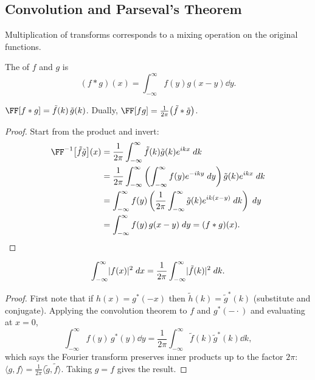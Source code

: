 \documentclass[a4paper]{scrartcl}
\begin{document}
\subsection{Convolution and Parseval's Theorem}

Multiplication of transforms corresponds to a mixing operation on the original functions.

\begin{definition}[Convolution]
    The  of $f$ and $g$ is
    $$
    (f * g)(x) = \int_{-\infty}^{\infty} f(y) g(x - y) \dd y.
    $$
\end{definition}

\begin{theorem}
    $\FF[f * g] = \tilde{f}(k)\, \tilde{g}(k)$. Dually, $\FF[fg] = \frac{1}{2\pi} \big(\tilde{f} * \tilde{g}\big)$.
\end{theorem}
\begin{proof}
    Start from the product and invert:
    \begin{align*}
        \FF^{-1}\big[\tilde f \tilde g\big](x) &= \frac{1}{2\pi}\int_{-\infty}^{\infty} \tilde{f}(k) \tilde{g}(k) e^{ikx} \dd k \\
        &= \frac{1}{2\pi}\int_{-\infty}^{\infty} \left(\int_{-\infty}^{\infty} f(y) e^{-iky} \dd y\right) \tilde{g}(k) e^{ikx} \dd k \\
        &= \int_{-\infty}^{\infty} f(y) \left(\frac{1}{2 \pi}\int_{-\infty}^{\infty} \tilde{g}(k) e^{ik(x - y)} \dd k\right) \dd y \\
        &= \int_{-\infty}^{\infty} f(y)\, g(x - y) \dd y = (f * g)(x). \qedhere
    \end{align*}
\end{proof}

\begin{theorem}
    $$
    \int_{-\infty}^{\infty} \lvert f(x)\rvert^2 \; d x = \frac{1}{2\pi} \int_{-\infty}^{\infty} \lvert\tilde{f}(k)\rvert^2 \; d k.
    $$
\end{theorem}
\begin{proof}
    First note that if $h(x) = g^*(-x)$ then $\tilde{h}(k) = \tilde{g}^*(k)$ (substitute and conjugate). Applying the convolution theorem to $f$ and $g^*(-\cdot)$ and evaluating at $x = 0$,
    $$
    \int_{-\infty}^{\infty} f(y)\, g^*(y) \dd y = \frac{1}{2\pi}\int_{-\infty}^{\infty} \tilde{f}(k) \tilde{g}^*(k) \dd k,
    $$
    which says the Fourier transform preserves inner products up to the factor $2\pi$: $\langle g, f\rangle = \frac{1}{2\pi}\langle \tilde{g}, \tilde{f} \rangle$. Taking $g = f$ gives the result.
\end{proof}
\end{document}
